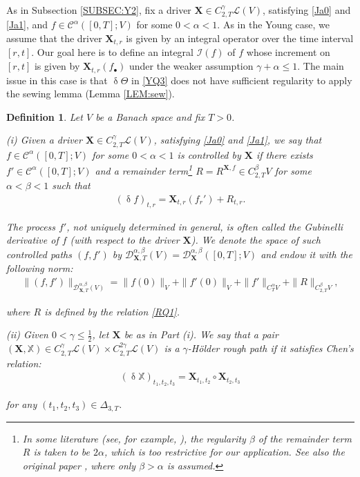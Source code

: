 \documentclass[letterpaper, 11pt,  reqno]{amsart}
\newtheorem{definition}[theorem]{Definition}
\newcommand{\1}{\hspace{0.5mm}\textup{I}\hspace{0.5mm}}
\newcommand{\I}{\mathcal{I}}
\newcommand{\noi}{\noindent}
\newcommand{\bul}{\bullet}
\newcommand{\CC}{\mathcal{C}}
\newcommand{\D}{\mathcal{D}}
\renewcommand{\L}{\mathcal{L}}
\newcommand{\al}{\alpha}
\newcommand{\be}{\beta}
\newcommand{\updl}{\updelta}
\newcommand{\Dl}{\Delta}
\newcommand{\g}{\gamma}
\newcommand{\Ta}{\Theta}
\newcommand{\XXb}{\mathbb{X}}
\newcommand{\XX}{\mathbf{X}}
\numberwithin{equation}{section}
\numberwithin{theorem}{section}
\begin{document}
As in Subsection \ref{SUBSEC:Y2}, 
fix 
a driver  $\XX\in C^\g_{2,T}\L(V)$, 
satisfying \eqref{Ja0} and \eqref{Ja1}, 
and 
$f\in \CC^{\al}([0,T];V)$ for some $0 < \al < 1$.
As in the Young case, 
 we assume  that the driver $\XX_{t, r}$
is given by an integral operator
over the time interval $[r, t]$.
Our goal here is to define an 
integral $\I(f)$ of $f$
whose increment on $[r, t]$ is given by $\XX_{t, r}(f_\bul)$
under the weaker assumption $\g + \al \le 1$.
The main issue in this case is that 
$\updl \Ta$ in \eqref{YQ3}
does not have sufficient regularity to apply the sewing lemma (Lemma \ref{LEM:sew}).






\begin{definition}\label{DEF:control}\rm
Let $V$ be a Banach space
and fix $T > 0$.


\smallskip

\noi
(i) Given a driver  $\XX\in C^\g_{2,T}\L(V)$, 
satisfying \eqref{Ja0} and \eqref{Ja1}, 
we say that 
$f\in \CC^{\al}([0,T];V)$ for some $0 < \al < 1$
is controlled 
by $\XX$  if there exists $f'\in \CC^{\al}([0,T];V)$
and a remainder term\footnote{In some literature (see, for example,  \cite{FH20}),
the regularity $\be$ of the remainder term $R$ is taken to be $2\al$, 
which is too restrictive for our application.
See also the original paper \cite{Gub04}, 
where only $\be > \al$ is assumed.}
 $R = R^{\XX, f} \in  C^{\be}_{2, T} V$
for some $\al < \be < 1$
such that 
\begin{align}
(\updl f)_{t, r} = \XX_{t, r} (f_r') + R_{t, r}.
\label{RQ1}
\end{align}

\noi
The process $f'$, not uniquely determined in general,  is often called the Gubinelli derivative of $f$
(with respect to the driver $\XX$).
We denote 
the space of such controlled  paths $(f, f')$
by 
$\D^{\al, \be}_{\XX, T}(V) = \D^{\al, \be}_\XX([0, T]; V)$ 
and endow it with the following norm:
\begin{align}
\| (f, f') \|_{\D^{\al, \be}_{\XX, T}(V)} 
= \|f(0) \|_{V} + \|f'(0)\|_V
+ \| f' \|_{C^\al_TV} + \| R \|_{C^\be_{2, T}V},
\label{RQ1a}
\end{align}

\noi
where $R $ is defined by  the relation \eqref{RQ1}.



\medskip


\noi
(ii)
Given $0 < \g \le \frac12 $, 
let $\XX$ be as in Part (i).
We say that a pair $(\XX, \XXb) 
\in C^\g_{2,T}\L(V)\times  C^{2\g}_{2,T}\L(V)$
is a $\g$-H\"older rough path  
if it satisfies  Chen's relation:
\begin{align}
(\updl \XXb)_{t_1,t_2,t_3}  = \XX_{t_1,t_2} \circ \XX_{t_2,t_3}
\label{RQ2}
\end{align}

\noi
for any $(t_1, t_2, t_3) \in\Dl_{3, T}$.

\end{definition}
\end{document}
